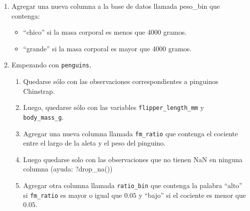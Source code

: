 \documentclass[a4paper,11pt]{article}
\theoremstyle{definition}
\begin{document}
\begin{enumerate}
\item Agregar una nueva columna a la base de datos llamada peso_bin que contenga:
\begin{itemize}
\item ``chico'' si la masa corporal es menos que 4000 gramos.
\item ``grande'' si la masa corporal es mayor que 4000 gramos.
\end{itemize}

\item Empezando con \lstinline{penguins},

\begin{enumerate}
\item Quedarse sólo con las observaciones correspondientes a pinguinos Chinstrap. 
\item Luego, quedarse sólo con las variables \lstinline{flipper_length_mm} y \lstinline{body_mass_g}. 
\item Agregar una nueva columna llamada \lstinline{fm_ratio} que contenga el cociente entre el largo de la aleta y el peso del pinguino. 
\item Luego quedarse solo con las observaciones que no tienen NaN en ninguna columna (ayuda: ?drop_na())
\item Agregar otra columna llamada \lstinline{ratio_bin} que contenga la palabra ``alto'' si \lstinline{fm_ratio} es mayor o igual que $0.05$ y ``bajo'' si el cociente es menor que $0.05$.
\end{enumerate}

\end{enumerate}
\end{document}
